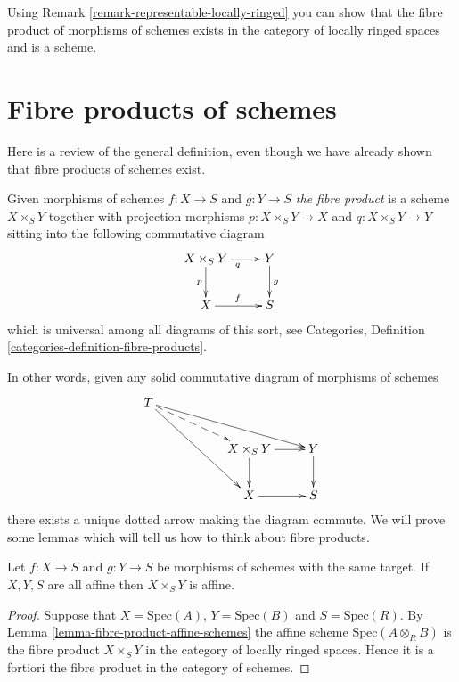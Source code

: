 \begin{remark}
\label{remark-fibre-product-schemes-locally-ringed}
Using Remark \ref{remark-representable-locally-ringed}
you can show that the fibre product of morphisms of schemes
exists in the category of locally ringed spaces and is a
scheme.
\end{remark}




\section{Fibre products of schemes}
\label{section-fibre-products}

\noindent
Here is a review of the general definition, even though
we have already shown that fibre products of schemes exist.

\begin{definition}
\label{definition-fibre-product}
Given morphisms of schemes $f : X \to S$ and $g : Y \to S$
{\it the fibre product} is a scheme $X\times_S Y$ together
with projection morphisms $p : X \times_S Y \to X$
and $q : X \times_S Y \to Y$ sitting into the following
commutative diagram
$$
\xymatrix{
X \times_S Y \ar[r]_q \ar[d]_p & Y \ar[d]^g \\
X \ar[r]^f & S
}
$$
which is universal among all diagrams of this sort,
see Categories, Definition \ref{categories-definition-fibre-products}.
\end{definition}

\noindent
In other words, given any solid commutative diagram of 
morphisms of schemes
$$
\xymatrix{
T \ar[rrrd] \ar@{-->}[rrd] \ar[rrdd]
&
&
\\
&
&
X\times_S Y \ar[d] \ar[r]
&
Y \ar[d]
\\
&
&
X \ar[r]
&
S
}
$$
there exists a unique dotted arrow making the diagram commute.
We will prove some lemmas which will tell us how to think about
fibre products.

\begin{lemma}
\label{lemma-fibre-product-affines}
Let $f : X \to S$ and $g : Y \to S$ be morphisms of schemes
with the same target. If $X, Y, S$ are all affine then
$X \times_S Y$ is affine.
\end{lemma}

\begin{proof}
Suppose that $X = \text{Spec}(A)$, $Y = \text{Spec}(B)$
and $S = \text{Spec}(R)$. By Lemma \ref{lemma-fibre-product-affine-schemes}
the affine scheme $\text{Spec}(A \otimes_R B)$
is the fibre product $X \times_S Y$ in the category
of locally ringed spaces. Hence it is a fortiori the
fibre product in the category of schemes.
\end{proof}

